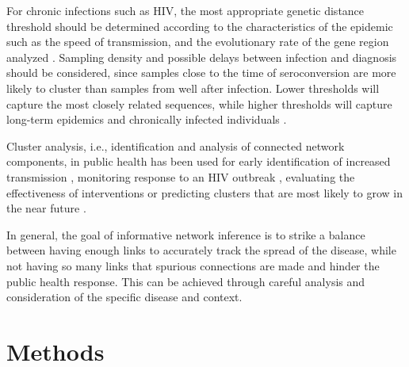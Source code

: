 \documentclass[utf8]{FrontiersinHarvard} %
\newcommand{\TODO}[1]{{\color{red}{#1}}}
\begin{document}
For chronic infections such as HIV, the most appropriate genetic distance 
threshold should be determined according to the characteristics of the epidemic such
as the speed of transmission, and the evolutionary rate of the gene region analyzed
\cite{liu_dynamics_2020}. Sampling density and possible delays between
infection and diagnosis should be considered, since samples close to the time of
seroconversion are more likely to cluster than samples from well after
infection.  Lower thresholds will capture the most closely related sequences,
while higher thresholds will capture long-term epidemics and chronically
infected individuals \cite{junqueira_factors_2019}.

Cluster analysis, i.e., identification and analysis of connected network components, in public health has been used for early
identification of increased transmission \cite{oster_hiv_2021,
oster_identifying_2018}, monitoring response to an HIV outbreak
\cite{tumpney_human_2020, sizemore_using_2020, tookes_rapid_2020}, evaluating
the effectiveness of interventions
\cite{peters_hiv_2016,wang_targeting_2015,liu_dynamics_2020} or predicting
clusters that are most likely to grow in the near future
\cite{erly_predictive_2021,ragonnet-cronin_forecasting_2022}. 

In general, the goal of informative network inference is to strike a balance between having enough links to
accurately track the spread of the disease, while not having so many links that
spurious connections are made and hinder the public health response. This can be
achieved through careful analysis and consideration of the specific disease and
context. 

\TODO{HV: Add a final short paragraph here that conveys "We're addressing the problem of inferring the correct distance threshold with AutoTune. AutoTune is an improvement over other ways people guess the proper distance threshold for these reasons. AutoTune is a useful tool."}


\section{Methods}
\end{document}
